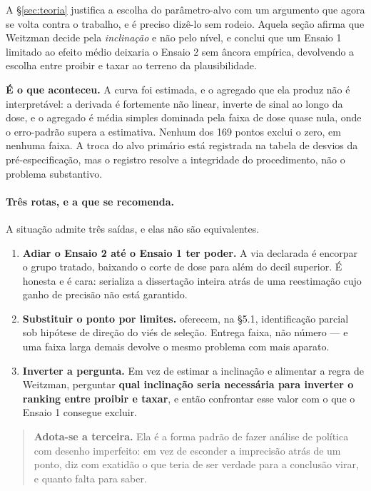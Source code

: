 A §\ref{sec:teoria} justifica a escolha do parâmetro-alvo com um argumento que
agora se volta contra o trabalho, e é preciso dizê-lo sem rodeio. Aquela seção
afirma que Weitzman decide pela \emph{inclinação} e não pelo nível, e conclui
que um Ensaio 1 limitado ao efeito médio deixaria o Ensaio 2 sem âncora
empírica, devolvendo a escolha entre proibir e taxar ao terreno da
plausibilidade.

\textbf{É o que aconteceu.} A curva foi estimada, e o agregado que ela produz não
é interpretável: a derivada é fortemente não linear, inverte de sinal ao longo da
dose, e o agregado é média simples dominada pela faixa de dose quase nula, onde
o erro-padrão supera a estimativa. Nenhum dos 169 pontos exclui o zero, em
nenhuma faixa. A troca do alvo primário está registrada na tabela de desvios da
pré-especificação, mas o registro resolve a integridade do procedimento, não o
problema substantivo.

\paragraph{Três rotas, e a que se recomenda.}
A situação admite três saídas, e elas não são equivalentes.

\begin{enumerate}
\item \textbf{Adiar o Ensaio 2 até o Ensaio 1 ter poder.} A via declarada é
  encorpar o grupo tratado, baixando o corte de dose para além do decil
  superior. É honesta e é cara: serializa a dissertação inteira atrás de uma
  reestimação cujo ganho de precisão não está garantido.

\item \textbf{Substituir o ponto por limites.} \citet{callaway2024continuous}
  oferecem, na §5.1, identificação parcial sob hipótese de direção do viés de
  seleção. Entrega faixa, não número --- e uma faixa larga demais devolve o
  mesmo problema com mais aparato.

\item \textbf{Inverter a pergunta.} Em vez de estimar a inclinação e alimentar a
  regra de Weitzman, perguntar \textbf{qual inclinação seria necessária para
  inverter o ranking entre proibir e taxar}, e então confrontar esse valor com o
  que o Ensaio 1 consegue excluir.
\end{enumerate}

\begin{quote}
\textbf{Adota-se a terceira.} Ela é a forma padrão de fazer análise de política
com desenho imperfeito: em vez de esconder a imprecisão atrás de um ponto, diz
com exatidão o que teria de ser verdade para a conclusão virar, e quanto falta
para saber.
\end{quote}

